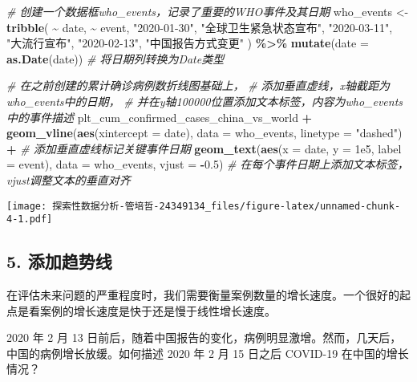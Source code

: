 \documentclass[
]{article}
\newenvironment{Shaded}{\begin{snugshade}}{\end{snugshade}}
\newcommand{\AttributeTok}[1]{\textcolor[rgb]{0.13,0.29,0.53}{#1}}
\newcommand{\CommentTok}[1]{\textcolor[rgb]{0.56,0.35,0.01}{\textit{#1}}}
\newcommand{\FloatTok}[1]{\textcolor[rgb]{0.00,0.00,0.81}{#1}}
\newcommand{\FunctionTok}[1]{\textcolor[rgb]{0.13,0.29,0.53}{\textbf{#1}}}
\newcommand{\NormalTok}[1]{#1}
\newcommand{\OtherTok}[1]{\textcolor[rgb]{0.56,0.35,0.01}{#1}}
\newcommand{\SpecialCharTok}[1]{\textcolor[rgb]{0.81,0.36,0.00}{\textbf{#1}}}
\newcommand{\StringTok}[1]{\textcolor[rgb]{0.31,0.60,0.02}{#1}}
\begin{document}
\begin{Shaded}
\begin{Highlighting}[]
\CommentTok{\# 创建一个数据框who\_events，记录了重要的WHO事件及其日期}
\NormalTok{who\_events }\OtherTok{\textless{}{-}} \FunctionTok{tribble}\NormalTok{(}
  \SpecialCharTok{\textasciitilde{}}\NormalTok{ date,                    }\SpecialCharTok{\textasciitilde{}}\NormalTok{ event,}
  \StringTok{"2020{-}01{-}30"}\NormalTok{,             }\StringTok{"全球卫生紧急状态宣布"}\NormalTok{,}
  \StringTok{"2020{-}03{-}11"}\NormalTok{,             }\StringTok{"大流行宣布"}\NormalTok{,}
  \StringTok{"2020{-}02{-}13"}\NormalTok{,             }\StringTok{"中国报告方式变更"}
\NormalTok{) }\SpecialCharTok{\%\textgreater{}\%}
  \FunctionTok{mutate}\NormalTok{(}\AttributeTok{date =} \FunctionTok{as.Date}\NormalTok{(date))  }\CommentTok{\# 将日期列转换为Date类型}

\CommentTok{\# 在之前创建的累计确诊病例数折线图基础上，}
\CommentTok{\# 添加垂直虚线，x轴截距为who\_events中的日期，}
\CommentTok{\# 并在y轴100000位置添加文本标签，内容为who\_events中的事件描述}
\NormalTok{plt\_cum\_confirmed\_cases\_china\_vs\_world }\SpecialCharTok{+}
  \FunctionTok{geom\_vline}\NormalTok{(}\FunctionTok{aes}\NormalTok{(}\AttributeTok{xintercept =}\NormalTok{ date), }\AttributeTok{data =}\NormalTok{ who\_events, }\AttributeTok{linetype =} \StringTok{"dashed"}\NormalTok{) }\SpecialCharTok{+}  \CommentTok{\# 添加垂直虚线标记关键事件日期}
  \FunctionTok{geom\_text}\NormalTok{(}\FunctionTok{aes}\NormalTok{(}\AttributeTok{x =}\NormalTok{ date, }\AttributeTok{y =} \FloatTok{1e5}\NormalTok{, }\AttributeTok{label =}\NormalTok{ event), }\AttributeTok{data =}\NormalTok{ who\_events, }\AttributeTok{vjust =} \SpecialCharTok{{-}}\FloatTok{0.5}\NormalTok{)  }\CommentTok{\# 在每个事件日期上添加文本标签，vjust调整文本的垂直对齐}
\end{Highlighting}
\end{Shaded}

\texttt{[image: 探索性数据分析-管培哲-24349134\_files/figure-latex/unnamed-chunk-4-1.pdf]}

\subsection{5. 添加趋势线}\label{ux6dfbux52a0ux8d8bux52bfux7ebf}

在评估未来问题的严重程度时，我们需要衡量案例数量的增长速度。一个很好的起点是看案例的增长速度是快于还是慢于线性增长速度。

2020 年 2 月 13
日前后，随着中国报告的变化，病例明显激增。然而，几天后，中国的病例增长放缓。如何描述
2020 年 2 月 15 日之后 COVID-19 在中国的增长情况？
\end{document}
